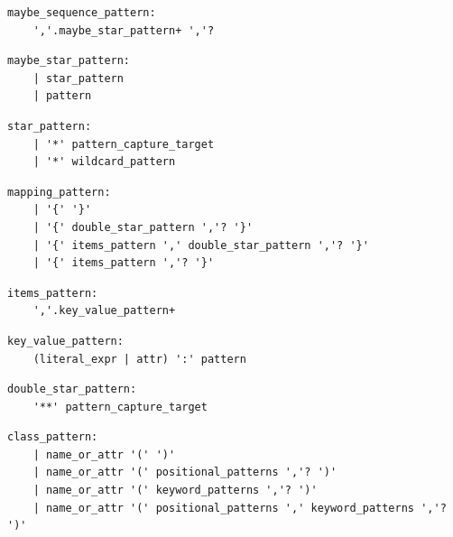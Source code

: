 \noindent\textbf{\texttt{}}\par
\begin{lstlisting}
maybe_sequence_pattern:
    ','.maybe_star_pattern+ ','?
\end{lstlisting}

\noindent\textbf{\texttt{}}\par
\begin{lstlisting}
maybe_star_pattern:
    | star_pattern
    | pattern
\end{lstlisting}

\noindent\textbf{\texttt{}}\par
\begin{lstlisting}
star_pattern:
    | '*' pattern_capture_target
    | '*' wildcard_pattern
\end{lstlisting}

\noindent\textbf{\texttt{}}\par
\begin{lstlisting}
mapping_pattern:
    | '{' '}'
    | '{' double_star_pattern ','? '}'
    | '{' items_pattern ',' double_star_pattern ','? '}'
    | '{' items_pattern ','? '}'
\end{lstlisting}

\noindent\textbf{\texttt{}}\par
\begin{lstlisting}
items_pattern:
    ','.key_value_pattern+
\end{lstlisting}

\noindent\textbf{\texttt{}}\par
\begin{lstlisting}
key_value_pattern:
    (literal_expr | attr) ':' pattern
\end{lstlisting}

\noindent\textbf{\texttt{}}\par
\begin{lstlisting}
double_star_pattern:
    '**' pattern_capture_target
\end{lstlisting}

\noindent\textbf{\texttt{}}\par
\begin{lstlisting}
class_pattern:
    | name_or_attr '(' ')'
    | name_or_attr '(' positional_patterns ','? ')'
    | name_or_attr '(' keyword_patterns ','? ')'
    | name_or_attr '(' positional_patterns ',' keyword_patterns ','? ')'
\end{lstlisting}

